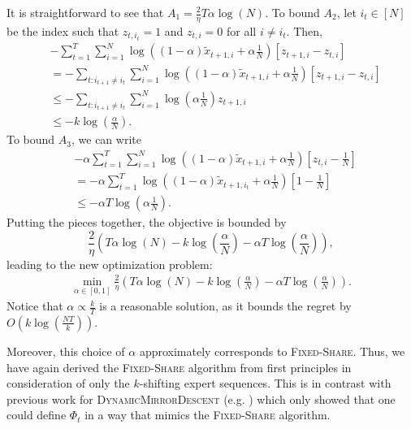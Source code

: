 \documentclass{article}
\newcommand{\cO}{O}
\begin{document}
It is straightforward to see that $A_1 = \frac{2}{\eta}T \alpha \log(N)$.
To bound $A_2$, let $i_t \in [N]$ be the index such that $z_{t,i_t} = 1$ and $z_{t,i} = 0$ for all $i \neq i_t$.
Then,
\begin{align*}
  &-\sum_{t = 1}^T \sum_{i=1}^N \log\left((1-\alpha) \tilde{x}_{t+1, i} + \alpha \frac{1}{N}\right) \left[ z_{t+1,i} - z_{t,i} \right] \\
  & = - \sum_{t: i_{t+1} \neq i_t} \sum_{i=1}^N \log\left((1-\alpha) \tilde{x}_{t+1, i} + \alpha \frac{1}{N}\right) \left[ z_{t+1,i} - z_{t,i} \right] \\
  &\leq - \sum_{t: i_{t+1} \neq i_t} \sum_{i=1}^N \log\left( \alpha \frac{1}{N}\right)  z_{t+1,i} \\
  &\leq  - k \log\left(\frac{\alpha}{N}\right).
\end{align*}
To bound $A_3$, we can write
\begin{align*}
  &-\alpha \sum_{t = 1}^T \sum_{i=1}^N \log\left((1-\alpha) \tilde{x}_{t+1, i} + \alpha \frac{1}{N}\right) \left[ z_{t,i} - \frac{1}{N} \right] \\
  & =  -\alpha \sum_{t = 1}^T \log\left((1-\alpha) \tilde{x}_{t+1, i_t} + \alpha \frac{1}{N}\right) \left[ 1  - \frac{1}{N} \right]\\
  &\leq  -\alpha T \log\left(\alpha \frac{1}{N}\right). 
\end{align*}
Putting the pieces together, the objective is bounded by
$$\frac{2}{\eta} \left( T \alpha \log(N) - k \log\left(\frac{\alpha}{N}\right) - \alpha T \log \left(\frac{\alpha}{N}\right) \right),$$
leading to the new optimization problem:
\begin{align*}
  \min_{\alpha \in [0,1] } \frac{2}{\eta} \left( T \alpha \log(N) - k \log\left(\frac{\alpha}{N}\right) - \alpha T \log \left(\frac{\alpha}{N}\right) \right).
\end{align*}
Notice that $\alpha \propto \frac{k}{T}$ is a reasonable solution, as it 
bounds the regret by
$\cO\left( k \log\left(\frac{NT}{k}\right)\right)$.

Moreover, this choice of $\alpha$ approximately corresponds to
\textsc{Fixed-Share}.  Thus, we have again derived the
\textsc{Fixed-Share} algorithm from first principles in consideration
of only the $k$-shifting expert sequences.  This is in contrast with
previous work for \textsc{DynamicMirrorDescent}
(e.g. \citep{GyorgySzepesvari2016}) which only showed that one
could define $\Phi_t$ in a way that mimics the \textsc{Fixed-Share}
algorithm.
\end{document}
